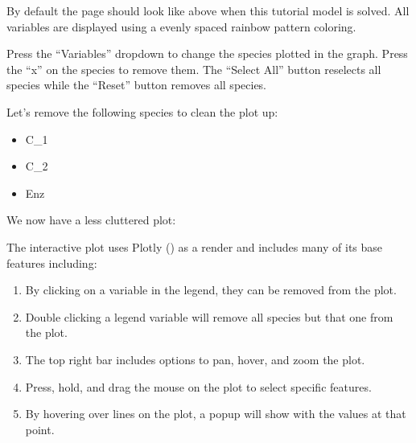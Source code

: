 \documentclass[letterpaper,10pt,english]{sphinxmanual}
\begin{document}
\begin{figure}[htbp]
\centering

\noindent{}
\end{figure}

\sphinxAtStartPar
By default the page should look like above when this tutorial model is solved.
All variables are displayed using a evenly spaced rainbow pattern coloring.

\sphinxAtStartPar
Press the “Variables” dropdown to change the species plotted in the graph.
Press the “x” on the species to remove them.  The “Select All” button
reselects all species while the “Reset” button removes all species.

\begin{figure}[htbp]
\centering

\noindent{}
\end{figure}

\sphinxAtStartPar
Let’s remove the following species to clean the plot up:
\begin{itemize}
\item {} 
\sphinxAtStartPar
C\_1

\item {} 
\sphinxAtStartPar
C\_2

\item {} 
\sphinxAtStartPar
Enz

\end{itemize}

\sphinxAtStartPar
We now have a less cluttered plot:

\begin{figure}[htbp]
\centering

\noindent{}
\end{figure}

\sphinxAtStartPar
The interactive plot uses Plotly ()
as a render and includes many of its base features including:
\begin{enumerate}
%
\item {} 
\sphinxAtStartPar
By clicking on a variable in the legend, they can be removed from the plot.

\item {} 
\sphinxAtStartPar
Double clicking a legend variable will remove all species but that one
from the plot.

\item {} 
\sphinxAtStartPar
The top right bar includes options to pan, hover, and zoom the plot.

\item {} 
\sphinxAtStartPar
Press, hold, and drag the mouse on the plot to select specific features.

\item {} 
\sphinxAtStartPar
By hovering over lines on the plot, a popup will show with the values
at that point.

\end{enumerate}
\end{document}
